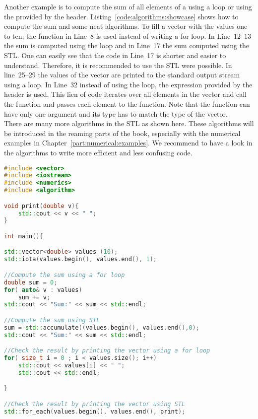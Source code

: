 Another example is to compute the sum of all elements of a  using a  loop or using the  provided by the  header. Listing~\ref{code:algorithms:showcase} shows how to compute the sum and some neat algorithms. To fill a vector with the values one to ten, the function  in Line~8 is used instead of writing a for loop. In Line~12--13 the sum is computed using the loop and in Line~17 the sum computed using the STL. One can easily see that the code in Line~17 is shorter and easier to understand. Therefore, it is recommended to use the STL were possible. In line~25--29 the values of the vector are printed to the standard output stream using a  loop. In Line~32 instead of using the  loop, the expression  provided by the  header is used. This lien of code iterates over all elements in the vector and call the function  and passes each element to the function. Note that the function can have only one argument and its type has to match the type of the vector.\\

There are many more algorithms in the STL as shown here. These algorithms will be introduced in the reaming parts of the book, especially with the numerical examples in Chapter~\ref{part:numerical:examples}. We recommend to have a look in the algorithms to write more efficient and less confusing code.   


\begin{lstlisting}[language=c++,caption={Example for a function definition to compute the maximum of two numbers.\label{code:algorithms:showcase}},float,floatplacement=tb]
#include <vector> 
#include <iostream>
#include <numerics>
#include <algorithm>

void print(double v){
	std::cout << v << " ";
}

int main(){

std::vector<double> values (10);
std::iota(values.begin(), values.end(), 1);

//Compute the sum using a for loop
double sum = 0;
for( auto& v : values)
	sum += v;
std::cout << "Sum:" << sum << std::endl;

//Compute the sum using STL 
sum = std::accumulate((values.begin(), values.end(),0);
std::cout << "Sum:" << sum << std::endl;

//Check the result by printing the vector using a for loop
for( size_t i = 0 ; i < values.size(); i++)
	std::cout << values[i] << " ";
	std::cout << std::endl;

}

//Check the result by printing the vector using STL
std::for_each(values.begin(), values.end(), print);
\end{lstlisting}



